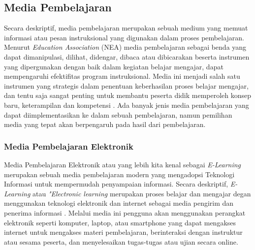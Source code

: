 \subsection{Media Pembelajaran}
Secara deskriptif, media pembelajaran merupakan sebuah medium yang memuat informasi atau pesan instruksional yang digunakan dalam proses pembelajaran\cite{hasan2021media}. 
Menurut \textit{Education Association} (NEA) media pembelajaran sebagai benda yang dapat dimanipulasi, dilihat, didengar, dibaca atau dibicarakan 
beserta instrumen yang dipergunakan dengan baik dalam kegiatan belajar mengajar, dapat mempengaruhi efektifitas program instruksional\cite{arsyad2011media}.
Media ini menjadi salah satu instrumen yang strategis dalam penentuan keberhasilan proses belajar mengajar, dan tentu saja sangat penting untuk membantu peserta didik memperoleh konsep baru, keterampilan dan kompetensi \cite{hasan2021media}.
Ada banyak jenis media pembelajaran yang dapat diimplementasikan ke dalam sebuah pembelajaran, namun pemilihan media yang tepat akan berpengaruh pada hasil dari pembelajaran.
\subsubsection{Media Pembelajaran Elektronik}
Media Pembelajaran Elektronik atau yang lebih kita kenal sebagai \textit{E-Learning} merupakan sebuah media pembelajaran modern yang mengadopsi Teknologi Informasi untuk mempermudah penyampaian informasi.
Secara deskriptif, \textit{E-Learning} atau \textit{"Electronic learning} merupakan proses belajar dan mengajar degan menggunakan teknologi elektronik dan internet sebagai media pengirim dan penerima informasi \cite{hanum2013keefetifan}.
Melalui media ini pengguna akan menggunakan perangkat elektronik seperti komputer, laptop, atau smartphone yang dapat mengakses internet untuk mengakses materi pembelajaran, berinteraksi dengan instruktur atau sesama peserta, dan menyelesaikan tugas-tugas atau ujian secara online.
